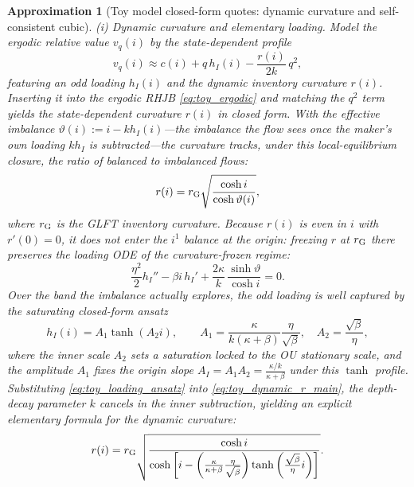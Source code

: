 \documentclass[11pt,a4paper]{article}
\theoremstyle{plain}
\newtheorem{approximation}[proposition]{Approximation}
\theoremstyle{definition}
\begin{document}
\begin{approximation}[Toy model closed-form quotes: dynamic curvature and self-consistent cubic]
\label{prop:toy_curvature}
\emph{(i) Dynamic curvature and elementary loading.}  Model the ergodic relative value \(v_q(i)\) by the state-dependent profile
\begin{equation}
v_q(i)\approx c(i)+q\,h_I(i)-\frac{r(i)}{2k}\,q^2 ,
\label{eq:toy_affine_ansatz}
\end{equation}
featuring an odd loading \(h_I(i)\) and the dynamic inventory curvature \(r(i)\).
Inserting it into the ergodic RHJB \eqref{eq:toy_ergodic} and matching the \(q^2\) term yields the state-dependent curvature \(r(i)\) in closed form. With the \emph{effective imbalance} \(\vartheta(i):=i-kh_I(i)\)---the imbalance the flow sees once the maker's own loading \(kh_I\) is subtracted---the curvature tracks, under this local-equilibrium closure, the ratio of balanced to imbalanced flows:
\begin{equation}
r(i)=r_{\rm G}\sqrt{\frac{\cosh i}{\cosh\vartheta(i)}},
\label{eq:toy_dynamic_r_main}
\end{equation}
where \(r_{\rm G}\) is the GLFT inventory curvature. Because \(r(i)\) is even in \(i\) with \(r'(0)=0\), it does not enter the \(i^1\) balance at the origin: freezing \(r\) at \(r_{\rm G}\) there preserves the loading ODE of the curvature-frozen regime:
\begin{equation}
\frac{\eta^2}{2}h_I''-\beta i\,h_I'
+\frac{2\kappa}{k}\,\frac{\sinh\vartheta}{\cosh i}=0 .
\label{eq:toy_lo_ode}
\end{equation}
Over the band the imbalance actually explores, the odd loading is well captured by the saturating closed-form ansatz
\begin{equation}
h_I(i) = A_1 \tanh(A_2 i), \qquad A_1 = \frac{\kappa}{k(\kappa+\beta)} \frac{\eta}{\sqrt{\beta}}, \quad A_2 = \frac{\sqrt{\beta}}{\eta},
\label{eq:toy_loading_ansatz}
\end{equation}
where the inner scale \(A_2\) sets a saturation locked to the OU stationary scale, and the amplitude \(A_1\) fixes the origin slope \(A_I = A_1 A_2 = \frac{\kappa/k}{\kappa+\beta}\) under this \(\tanh\) profile. Substituting \eqref{eq:toy_loading_ansatz} into \eqref{eq:toy_dynamic_r_main}, the depth-decay parameter \(k\) cancels in the inner subtraction, yielding an explicit elementary formula for the dynamic curvature:
\begin{equation}
r(i)=r_{\rm G}\sqrt{\frac{\cosh i}{\cosh\left[i-\left(\frac{\kappa}{\kappa+\beta}\frac{\eta}{\sqrt{\beta}}\right)\tanh\left(\frac{\sqrt{\beta}}{\eta}i\right)\right]}}.
\label{eq:toy_explicit_curvature_main}
\end{equation}


\end{approximation}
\end{document}
